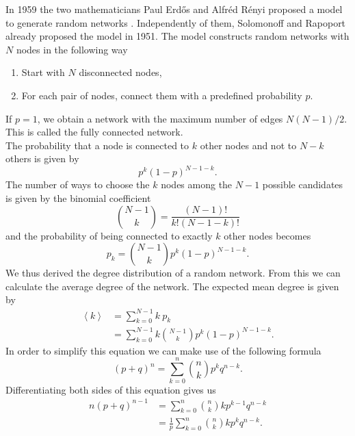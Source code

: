 \documentclass[11 pt , letterpaper , twoside , openright]{book}
\begin{document}
In 1959 the two mathematicians Paul Erd\H{o}s and Alfr\'{e}d R\'{e}nyi proposed a model to generate random networks \cite{F.Costa2007}. Independently of them, Solomonoff and Rapoport already proposed the model in 1951. The model constructs random networks with $N$ nodes in the following way \cite{Albert2002}
\begin{enumerate}
	\item Start with $N$ disconnected nodes,
	\item For each pair of nodes, connect them with a predefined probability $p$.
\end{enumerate} 
If $p=1$, we obtain a network with the maximum number of edges $N(N-1)/2$. This is called the fully connected network.\\
The probability that a node is connected to $k$ other nodes and not to $N-k$ others is given by
\begin{equation}
	p^k (1-p)^{N-1-k}.
\end{equation}
The number of ways to choose the $k$ nodes among the $N-1$ possible candidates is given by the binomial coefficient
\begin{equation}
	\binom{N-1}{k} = \frac{(N-1)!}{k!(N-1-k)!}
\end{equation}
and the probability of being connected to exactly $k$ other nodes becomes
\begin{equation}
	p_k = \binom{N-1}{k}p^k (1-p)^{N-1-k}.
\end{equation}
We thus derived the degree distribution of a random network. From this we can calculate the average degree of the network. The expected mean degree is given by \cite{Hopcroft2006}
\begin{equation}\label{avDeg}
\begin{split}
	\left<k\right> &= \sum_{k=0}^{N-1} k\  p_k  \\
&= \sum_{k=0}^{N-1} k \binom{N-1}{k}p^k (1-p)^{N-1-k}.
\end{split}
\end{equation}
In order to simplify this equation we can make use of the following formula \cite{Hopcroft2006}
\begin{equation} 
	(p+q)^n = \sum_{k=0}^n \binom{n}{k} p^k q^{n-k}.
\end{equation}
Differentiating both sides of this equation gives us \cite{Hopcroft2006}
\begin{equation}
\begin{split}
	n(p+q)^{n-1} &= \sum_{k=0}^n \binom{n}{k} k p^{k-1} q^{n-k} \\
	&= \frac{1}{p} \sum_{k=0}^n \binom{n}{k} k p^{k} q^{n-k}.
\end{split}
\end{equation}
\end{document}
